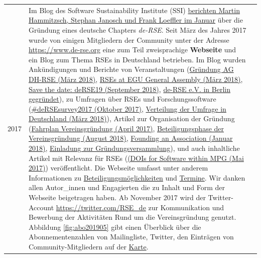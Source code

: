 \documentclass[a4paper]{article}
\begin{document}
\begin{center}
\begin{longtable}{| p{} | p{} | p{} |}
2017 & Im Blog des Software Sustainability Institute (SSI) \href{https://www.software.ac.uk/blog/2017-01-19-launching-german-rse-chapter-de-rse}{berichten Martin Hammitzsch, Stephan Janosch und Frank Loeffler im Januar} über die Gründung eines deutsche Chapters \emph{de-RSE}. Seit März des Jahres 2017 wurde von einigen Mitgliedern der Community unter der Adresse \href{https://www.de-rse.org}{https://www.de-rse.org} eine zum Teil zweisprachige \textbf{Webseite} und ein Blog zum Thema RSEs in Deutschland betrieben. Im Blog wurden Ankündigungen und Berichte von Veranstaltungen (\href{https://www.de-rse.org/blog/2018/03/01/digital-humanities-im-deutschsprachigen-raum-gruenden-rse-ag.html}{Gründung AG DH-RSE (März 2018)}, \href{https://www.de-rse.org/blog/2018/07/30/rses-at-egu-ga.html}{RSEs at EGU General Assembly (März 2018)}, \href{https://www.de-rse.org/blog/2018/09/03/conference-for-research-software-engineers-in-germany-2019.html}{Save the date: deRSE19 (September 2018)}, \href{https://www.de-rse.org/blog/2018/12/20/deRSE-gesellschaft-f\%C3\%BCr-forschungssoftware-in-berlin-gegr\%C3\%BCndet.html}{de-RSE e.V. in Berlin gegründet}), zu Umfragen über RSEs und Forschungssoftware (\href{https://www.de-rse.org/blog/2017/10/19/survey-about-research-software-in-germany-2017.html}{\#deRSEsurvey2017 (Oktober 2017)}, \href{https://www.de-rse.org/blog/2018/03/06/verteilung-der-umfrage-in-deutschland.html}{Verteilung der Umfrage in Deutschland (März 2018)}), Artikel zur Organisation der Gründung (\href{https://www.de-rse.org/blog/2017/04/28/fahrplan.html}{Fahrplan Vereinsgründung (April 2017)}, \href{https://www.de-rse.org/blog/2018/08/08/beteiligungphase-der-vereinsgr\%C3\%BCndung.html}{Beteiligungsphase der Vereinsgründung (August 2018)}, \href{https://www.de-rse.org/blog/2018/01/23/founding-association.html}{Founding an Association (Januar 2018)}, \href{https://www.de-rse.org/blog/2018/10/04/vereinsgr\%C3\%BCndung-am-26_11_2018-in-berlin.html}{Einladung zur Gründungsversammlung}), und auch inhaltliche Artikel mit Relevanz für RSEs (\href{https://www.de-rse.org/blog/howto/2017/05/08/how-to-assign-a-doi-to-software-within-mpg.html}{(DOIs for Software within MPG (Mai 2017)}) veröffentlicht. Die Webseite umfasst unter anderem Informationen zu \href{https://www.de-rse.org/de/join.html}{Beteiligungsmöglichkeiten} und \href{https://www.de-rse.org/en/events.html}{Termine}. \newline Wir danken allen Autor\_innen und Engagierten die zu Inhalt und Form der Webseite beigetragen haben. \newline Ab November 2017 wird der Twitter-Account \href{https://twitter.com/RSE_de}{https://twitter.com/RSE\_de} zur Kommunikation und Bewerbung der Aktivitäten Rund um die Vereinsgründung genutzt. Abbildung \ref{fig:abo201905} gibt einen Überblick über die Abonnementenzahlen von Mailingliste, Twitter, den Einträgen von Community-Mitgliedern auf der \href{https://www.de-rse.org/de/map.html}{Karte}.

\end{longtable}
\end{center}
\end{document}
